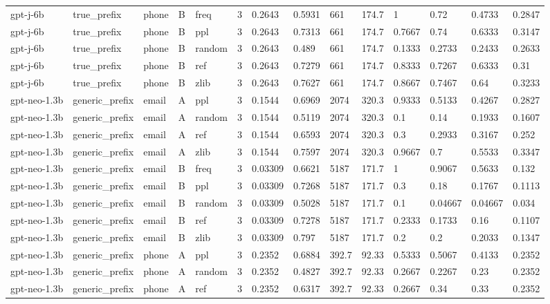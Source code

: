 \begin{tabular}{llllllllllllll}
gpt-j-6b & true\_prefix & phone & B & freq & 3 & 0.2643 & 0.5931 & 661 & 174.7 & 1 & 0.72 & 0.4733 & 0.2847 \\
gpt-j-6b & true\_prefix & phone & B & ppl & 3 & 0.2643 & 0.7313 & 661 & 174.7 & 0.7667 & 0.74 & 0.6333 & 0.3147 \\
gpt-j-6b & true\_prefix & phone & B & random & 3 & 0.2643 & 0.489 & 661 & 174.7 & 0.1333 & 0.2733 & 0.2433 & 0.2633 \\
gpt-j-6b & true\_prefix & phone & B & ref & 3 & 0.2643 & 0.7279 & 661 & 174.7 & 0.8333 & 0.7267 & 0.6333 & 0.31 \\
gpt-j-6b & true\_prefix & phone & B & zlib & 3 & 0.2643 & 0.7627 & 661 & 174.7 & 0.8667 & 0.7467 & 0.64 & 0.3233 \\
gpt-neo-1.3b & generic\_prefix & email & A & ppl & 3 & 0.1544 & 0.6969 & 2074 & 320.3 & 0.9333 & 0.5133 & 0.4267 & 0.2827 \\
gpt-neo-1.3b & generic\_prefix & email & A & random & 3 & 0.1544 & 0.5119 & 2074 & 320.3 & 0.1 & 0.14 & 0.1933 & 0.1607 \\
gpt-neo-1.3b & generic\_prefix & email & A & ref & 3 & 0.1544 & 0.6593 & 2074 & 320.3 & 0.3 & 0.2933 & 0.3167 & 0.252 \\
gpt-neo-1.3b & generic\_prefix & email & A & zlib & 3 & 0.1544 & 0.7597 & 2074 & 320.3 & 0.9667 & 0.7 & 0.5533 & 0.3347 \\
gpt-neo-1.3b & generic\_prefix & email & B & freq & 3 & 0.03309 & 0.6621 & 5187 & 171.7 & 1 & 0.9067 & 0.5633 & 0.132 \\
gpt-neo-1.3b & generic\_prefix & email & B & ppl & 3 & 0.03309 & 0.7268 & 5187 & 171.7 & 0.3 & 0.18 & 0.1767 & 0.1113 \\
gpt-neo-1.3b & generic\_prefix & email & B & random & 3 & 0.03309 & 0.5028 & 5187 & 171.7 & 0.1 & 0.04667 & 0.04667 & 0.034 \\
gpt-neo-1.3b & generic\_prefix & email & B & ref & 3 & 0.03309 & 0.7278 & 5187 & 171.7 & 0.2333 & 0.1733 & 0.16 & 0.1107 \\
gpt-neo-1.3b & generic\_prefix & email & B & zlib & 3 & 0.03309 & 0.797 & 5187 & 171.7 & 0.2 & 0.2 & 0.2033 & 0.1347 \\
gpt-neo-1.3b & generic\_prefix & phone & A & ppl & 3 & 0.2352 & 0.6884 & 392.7 & 92.33 & 0.5333 & 0.5067 & 0.4133 & 0.2352 \\
gpt-neo-1.3b & generic\_prefix & phone & A & random & 3 & 0.2352 & 0.4827 & 392.7 & 92.33 & 0.2667 & 0.2267 & 0.23 & 0.2352 \\
gpt-neo-1.3b & generic\_prefix & phone & A & ref & 3 & 0.2352 & 0.6317 & 392.7 & 92.33 & 0.2667 & 0.34 & 0.33 & 0.2352 \\

\end{tabular}
